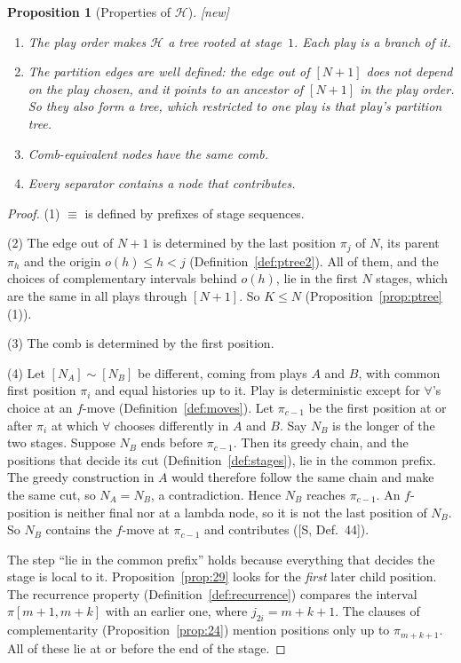 \documentclass[11pt]{article}
\newcommand{\iv}[2]{\pi[#1,#2]}
\newcommand{\New}{\textsf{[new]}}
\theoremstyle{plain}
\newtheorem{proposition}[theorem]{Proposition}
\theoremstyle{definition}
\theoremstyle{remark}
\begin{document}
\begin{proposition}[Properties of $\mathcal H$]\label{prop:hyper}
\New{}
\begin{enumerate}
\item The play order makes $\mathcal H$ a tree rooted at stage~$1$.
  Each play is a branch of it.
\item The partition edges are well defined: the edge out of $[N+1]$
  does not depend on the play chosen, and it points to an ancestor of
  $[N+1]$ in the play order.  So they also form a tree, which
  restricted to one play is that play's partition tree.
\item Comb-equivalent nodes have the same comb.
\item Every separator contains a node that contributes.
\end{enumerate}
\end{proposition}
\begin{proof}
(1) $\equiv$ is defined by prefixes of stage sequences.

(2) The edge out of $N+1$ is determined by the last position $\pi_j$ of
$N$, its parent $\pi_h$ and the origin $o(h)\le h<j$
(Definition~\ref{def:ptree2}).  All of them, and the choices of
complementary intervals behind $o(h)$, lie in the first $N$ stages,
which are the same in all plays through $[N+1]$.  So $K\le N$
(Proposition~\ref{prop:ptree}(1)).

(3) The comb is determined by the first position.

(4) Let $[N_A]\sim[N_B]$ be different, coming from plays $A$
and $B$, with common first position $\pi_i$ and equal histories up to
it.  Play is deterministic except for $\forall$'s choice at an
$f$-move (Definition~\ref{def:moves}).  Let $\pi_{c-1}$ be the first
position at or after $\pi_i$ at which $\forall$ chooses differently in $A$
and $B$.  Say $N_B$ is the longer of the two stages.  Suppose $N_B$
ends before $\pi_{c-1}$.  Then its greedy chain, and the positions that
decide its cut (Definition~\ref{def:stages}), lie in the common prefix.
The greedy construction in $A$ would therefore follow the same chain
and make the same cut, so $N_A=N_B$, a contradiction.  Hence $N_B$
reaches $\pi_{c-1}$.  An $f$-position is neither final nor at a lambda
node, so it is not the last position of $N_B$.  So $N_B$ contains the
$f$-move at $\pi_{c-1}$ and contributes ([S, Def.~44]).

The step ``lie in the common prefix'' holds because everything that
decides the stage is local to it.  Proposition~\ref{prop:29} looks for
the \emph{first} later child position.  The recurrence property
(Definition~\ref{def:recurrence}) compares the interval
$\iv{m+1}{m+k}$ with an earlier one, where $j_{2i}=m+k+1$.  The clauses
of complementarity (Proposition~\ref{prop:24}) mention positions only
up to $\pi_{m+k+1}$.  All of these lie at or before the end of the
stage.
\end{proof}
\end{document}
